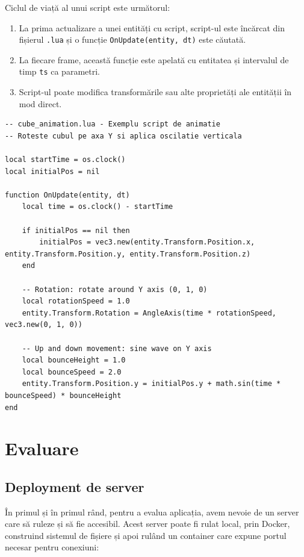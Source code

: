 \documentclass[12pt,a4paper]{report}
\numberwithin{equation}{section} %
\begin{document}
Ciclul de viață al unui script este următorul:
\begin{enumerate}
    \item La prima actualizare a unei entități cu script, script-ul este încărcat din fișierul \texttt{.lua} și o funcție \texttt{OnUpdate(entity, dt)} este căutată.
    \item La fiecare frame, această funcție este apelată cu entitatea și intervalul de timp \texttt{ts} ca parametri.
    \item Script-ul poate modifica transformările sau alte proprietăți ale entității în mod direct.
\end{enumerate}

\begin{lstlisting}[caption={\texttt{cube\_animation.lua} - Exemplu de script de animație.}, label={lst:cube_animation}, frame=single]
-- cube_animation.lua - Exemplu script de animatie
-- Roteste cubul pe axa Y si aplica oscilatie verticala

local startTime = os.clock()
local initialPos = nil

function OnUpdate(entity, dt)
    local time = os.clock() - startTime

    if initialPos == nil then
        initialPos = vec3.new(entity.Transform.Position.x, entity.Transform.Position.y, entity.Transform.Position.z)
    end

    -- Rotation: rotate around Y axis (0, 1, 0)
    local rotationSpeed = 1.0
    entity.Transform.Rotation = AngleAxis(time * rotationSpeed, vec3.new(0, 1, 0))

    -- Up and down movement: sine wave on Y axis
    local bounceHeight = 1.0
    local bounceSpeed = 2.0
    entity.Transform.Position.y = initialPos.y + math.sin(time * bounceSpeed) * bounceHeight
end
\end{lstlisting}


\chapter{\label{sec:evaluare}Evaluare}

\section{Deployment de server}

În primul și în primul rând, pentru a evalua aplicația, avem nevoie de un server care să ruleze și să fie accesibil.
Acest server poate fi rulat local, prin Docker, construind sistemul de fișiere și apoi rulând un container care expune portul necesar pentru conexiuni:
\end{document}
